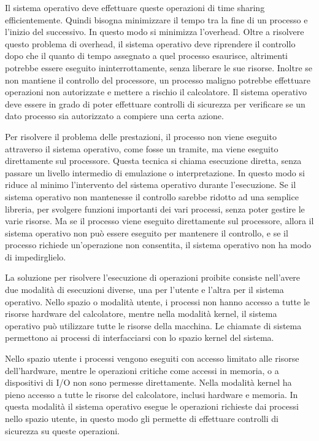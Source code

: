\documentclass{article}
\numberwithin{equation}{subsection}
\begin{document}
Il sistema operativo deve effettuare queste operazioni di time sharing efficientemente. Quindi bisogna minimizzare il tempo tra la fine di un processo e l'inizio del 
successivo. In questo modo si minimizza l'overhead. Oltre a risolvere questo problema di overhead, il sistema operativo deve riprendere il controllo dopo che il quanto 
di tempo assegnato a quel processo esaurisce, altrimenti potrebbe essere eseguito ininterrottamente, senza liberare le sue risorse. Inoltre se non mantiene il controllo 
del processore, un processo maligno potrebbe effettuare operazioni non autorizzate e mettere a rischio il calcolatore. Il sistema operativo deve essere in grado di 
poter effettuare controlli di sicurezza per verificare se un dato processo sia autorizzato a compiere una certa azione. 

Per risolvere il problema delle prestazioni, il processo non viene eseguito attraverso il sistema operativo, come fosse un tramite, ma viene eseguito direttamente 
sul processore. Questa tecnica si chiama esecuzione diretta, senza passare un livello intermedio di emulazione o interpretazione. In questo modo si riduce al minimo 
l'intervento del sistema operativo durante l'esecuzione. 
Se il sistema operativo non mantenesse il controllo sarebbe ridotto ad una semplice libreria, per svolgere funzioni importanti dei vari processi, senza poter gestire 
le varie risorse. 
Ma se il processo viene eseguito direttamente sul processore, allora il sistema operativo non può essere eseguito per mantenere il controllo, e se il processo 
richiede un'operazione non consentita, il sistema operativo non ha modo di impedirglielo. 

La soluzione per risolvere l'esecuzione di operazioni proibite consiste nell'avere due modalità di esecuzioni diverse, una per l'utente e l'altra per il sistema operativo. 
Nello spazio o modalità utente, i processi non hanno accesso a tutte le risorse hardware del calcolatore, mentre nella modalità kernel, il sistema operativo 
può utilizzare tutte le risorse della macchina. Le chiamate di sistema permettono ai processi di interfacciarsi con lo spazio kernel del sistema. 

Nello spazio utente i processi vengono eseguiti con accesso limitato alle risorse dell'hardware, mentre le operazioni critiche come accessi in memoria, o a dispositivi 
di I/O non sono permesse direttamente. 
Nella modalità kernel ha pieno accesso a tutte le risorse del calcolatore, inclusi hardware e memoria. In questa modalità il sistema operativo esegue le operazioni 
richieste dai processi nello spazio utente, in questo modo gli permette di effettuare controlli di sicurezza su queste operazioni. 
\end{document}
